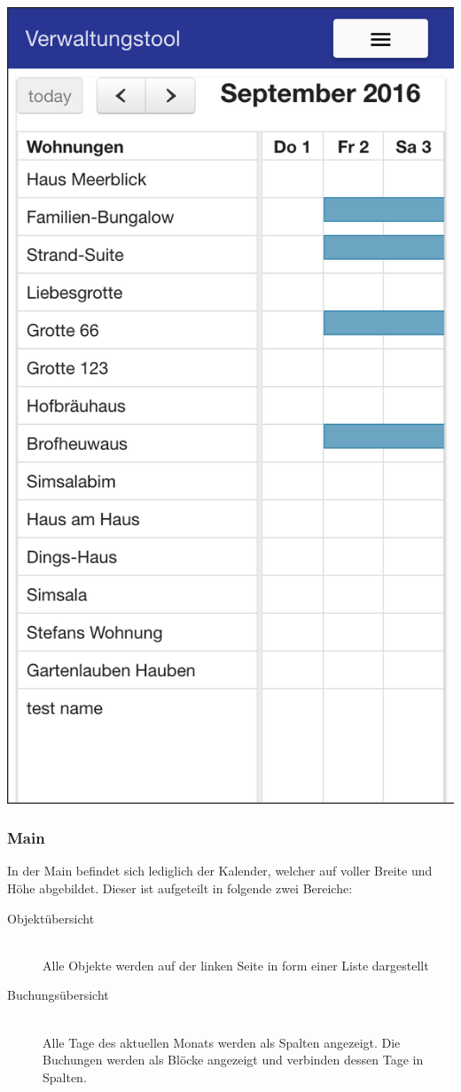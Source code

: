 \begin{minipage}{0.35\textwidth}
\includegraphics[width=\textwidth]{images/frontend_header_small.png}
\end{minipage}





\subsubsection{Main}
In der Main befindet sich lediglich der Kalender, welcher auf voller Breite und Höhe abgebildet.
Dieser ist aufgeteilt in folgende zwei Bereiche:
\begin{description}
\item[Objektübersicht]\hfill \\
Alle Objekte werden auf der linken Seite in form einer Liste dargestellt
\item[Buchungsübersicht]\hfill \\
Alle Tage des aktuellen Monats werden als Spalten angezeigt. Die Buchungen werden als Blöcke angezeigt und verbinden dessen Tage in Spalten.
\end{description}

